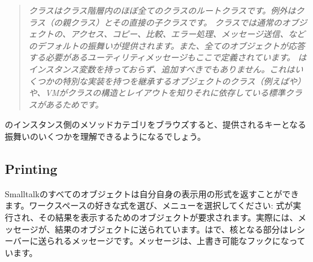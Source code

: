\documentclass[a4paper,10pt,twoside]{book}
\begin{document}
\begin{quote}
\textit{クラスはクラス階層内のほぼ全てのクラスのルートクラスです。例外はクラス（の親クラス）とその直接の子クラスです。
クラスでは通常のオブジェクトの、アクセス、コピー、比較、エラー処理、メッセージ送信、などのデフォルトの振舞いが提供されます。また、全てのオブジェクトが応答する必要があるユーティリティメッセージもここで定義されています。
はインスタンス変数を持っておらず、追加すべきでもありません。これはいくつかの特別な実装を持つを継承するオブジェクトのクラス（例えばや）や、VMがクラスの構造とレイアウトを知りそれに依存している標準クラスがあるためです。
}
\end{quote}

のインスタンス側のメソッドカテゴリをブラウズすると、提供されるキーとなる振舞いのいくつかを理解できるようになるでしょう。

\subsection{Printing}
Smalltalkのすべてのオブジェクトは自分自身の表示用の形式を返すことができます。ワークスペースの好きな式を選び、メニューを選択してください: 式が実行され、その結果を表示するためのオブジェクトが要求されます。実際には、メッセージが、結果のオブジェクトに送られています。はで、核となる部分はレシーバーに送られるメッセージです。メッセージは、上書き可能なフックになっています。
\end{document}
